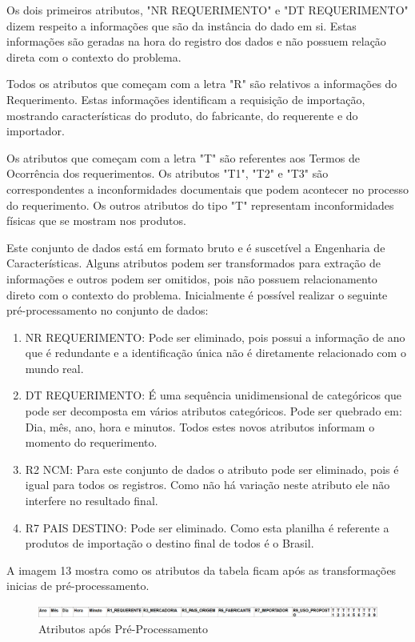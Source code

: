Os dois primeiros atributos, "NR REQUERIMENTO" e "DT REQUERIMENTO" dizem respeito a informações que são da instância do dado em si. Estas informações são geradas na hora do registro dos dados e não possuem relação direta com o contexto do problema.

Todos os atributos que começam com a letra "R" são relativos a informações do Requerimento. Estas informações identificam a requisição de importação, mostrando características do produto, do fabricante, do requerente e do importador.

Os atributos que começam com a letra "T" são referentes aos Termos de Ocorrência dos requerimentos. Os atributos "T1", "T2" e "T3" são correspondentes a inconformidades documentais que podem acontecer no processo do requerimento. Os outros atributos do tipo "T" representam inconformidades físicas que se mostram nos produtos.

Este conjunto de dados está em formato bruto e é suscetível a Engenharia de Características. Alguns atributos podem ser transformados para extração de informações e outros podem ser omitidos, pois não possuem relacionamento direto com o contexto do problema. Inicialmente é possível realizar o seguinte pré-processamento no conjunto de dados:

\begin{enumerate}
\item NR REQUERIMENTO: Pode ser eliminado, pois possui a informação de ano que é redundante e a identificação única não é diretamente relacionado com o mundo real.
\item DT REQUERIMENTO: É uma sequência unidimensional de categóricos que pode ser decomposta em vários atributos categóricos. Pode ser quebrado em: Dia, mês, ano, hora e minutos. Todos estes novos atributos informam o momento do requerimento.
\item  R2 NCM: Para este conjunto de dados o atributo pode ser eliminado, pois é igual para todos os registros. Como não há variação neste atributo ele não interfere no resultado final.
\item  R7 PAIS DESTINO: Pode ser eliminado. Como esta planilha é referente a produtos de importação o destino final de todos é o Brasil.
\end{enumerate}

A imagem 13 mostra como os atributos da tabela ficam após as transformações inicias de pré-processamento.

\begin{figure}[!h]
\centering
\includegraphics[keepaspectratio=true,scale=0.40]
{figuras/novatabela.eps}
\caption{Atributos após Pré-Processamento}
\label{tabelaMapa}
\end{figure}

